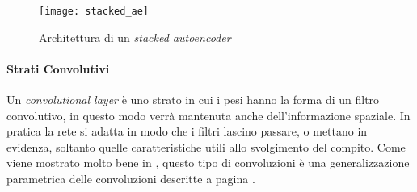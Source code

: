 \begin{figure}[ht] %
  \begin{center}
    \centering\texttt{[image: stacked\_ae]}
  \end{center}
  \caption{Architettura di un \textit{stacked autoencoder}}
  \label{fig:stacked_ae}
\end{figure}

\paragraph{Strati Convolutivi}
Un \textit{convolutional layer} è uno strato in cui i pesi hanno la forma di un filtro convolutivo, in questo modo verrà mantenuta anche dell'informazione spaziale.
In pratica la rete si adatta in modo che i filtri lascino passare, o mettano in evidenza, soltanto quelle caratteristiche utili allo svolgimento del compito.
Come viene mostrato molto bene in \cite{conv_arithm}, questo tipo di convoluzioni è una generalizzazione parametrica delle convoluzioni descritte a pagina \pageref{conv_para}.

